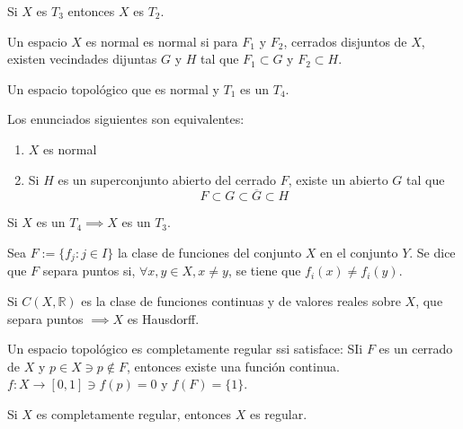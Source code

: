 \begin{teorema}
    Si $X$ es $T_3$ entonces $X$ es $T_2$. 
\end{teorema}

\begin{teorema}
    Un espacio $X$ es normal es normal si para $F_1$ y $F_2$, cerrados disjuntos de $X$, existen vecindades dijuntas $G$ y $H$ tal que $F_1\subset G$ y $F_2\subset H$.
\end{teorema}



\begin{definicion}
    Un espacio topológico que es normal y $T_1$ es un $T_4$. 
\end{definicion}

\begin{teorema}
    Los enunciados siguientes son equivalentes: 
    \begin{enumerate}
        \item $X$ es normal 
        \item Si $H$ es un superconjunto abierto del cerrado $F$, existe un abierto $G$ tal que 
        $$F\subset G\subset \overline{G}\subset H$$
    \end{enumerate}
\end{teorema}

\begin{prop}
    Si $X$ es un $T_4\implies X$ es un $T_3$.
\end{prop}


\begin{definicion}
    Sea $F:= \{f_j: j\in I\}$ la clase  de funciones del conjunto $X$ en el conjunto $Y$. Se dice que $F$ separa puntos si, $\forall x,y\in X,x\neq y$, se tiene que $f_i(x)\neq f_i(y)$. 
\end{definicion}


\begin{prop}
    Si $C(X,\mathbb{R})$ es la clase de funciones continuas y de valores reales sobre $X$, que separa puntos $\implies X$ es Hausdorff. 
    
\end{prop}


\begin{definicion}
    Un espacio topológico es completamente regular ssi satisface: SIi $F$ es un cerrado de $X$ y $p\in X\ni p\not\in F$, entonces existe una función continua. $f:X\to [0,1]\ni f(p)=0$ y $f(F)=\{1\}$.
\end{definicion}



\begin{teorema}
    Si $X$ es completamente regular, entonces $X$ es regular. 
\end{teorema}
